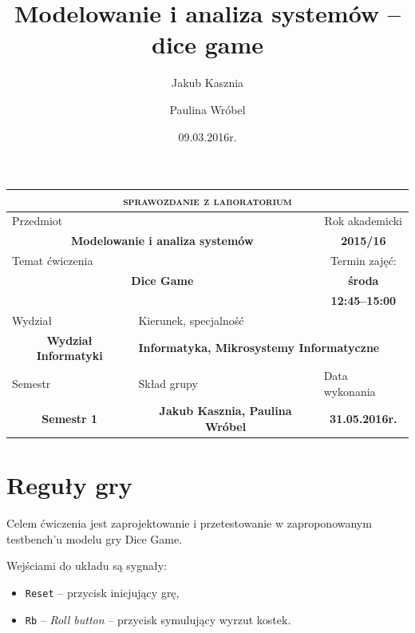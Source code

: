 \documentclass[a4paper,11pt,fleqn]{article}
\author{Jakub Kasznia \and Paulina Wr\'obel}
\title{Modelowanie i analiza system\'ow -- dice game}
\date{09.03.2016r.}
\begin{document}
\pagestyle{fancy}
\thispagestyle{plain}



\begin{table}[h]
\begin{center}
\noindent
\begin{tabular}{|c|c|c|}\hline
\multicolumn{3}{|c|}{\textsc{\large{sprawozdanie z laboratorium}}}\\\hline
\multicolumn{2}{|l|}{\small{Przedmiot}}&\small{Rok akademicki}\\
\multicolumn{2}{|c|}{\Large{\textbf{Modelowanie i analiza systemów}}}&\textbf{2015/16}\\\hline
\multicolumn{2}{|l|}{\small{Temat ćwiczenia}}&\small{Termin zajęć:}\\
\multicolumn{2}{|c|}{\textbf{\Large{Dice Game}}}&{\textbf{środa}}\\
\multicolumn{2}{|c|}{\textbf{\Large{}}}&{\textbf{12:45--15:00}}\\\hline
\multicolumn{1}{|l|}{\small{Wydział}}&\multicolumn{2}{|l|}{\small{Kierunek, specjalność}}\\
\textbf{Wydział Informatyki}&\multicolumn{2}{|l|}{\textbf{Informatyka, Mikrosystemy Informatyczne}}\\\hline
\multicolumn{1}{|l|}{\small{Semestr}}&\multicolumn{1}{|l|}{\small{Skład grupy}}&\multicolumn{1}{|l|}{\small{Data wykonania}}\\
\textbf{Semestr 1}&\textbf{Jakub Kasznia, Paulina Wróbel}&\textbf{31.05.2016r.}\\\hline
\end{tabular}
\end{center}
\end{table}


\section{Reguły gry}

Celem ćwiczenia jest zaprojektowanie i przetestowanie w zaproponowanym testbench'u modelu gry Dice Game.

\vspace{2ex}

Wejściami do układu są sygnały:
\begin{itemize}
\item \texttt{Reset} -- przycisk inicjujący grę,
\item \texttt{Rb} -- \textit{Roll button} -- przycisk symulujący wyrzut kostek.
\end{itemize}
\end{document}
